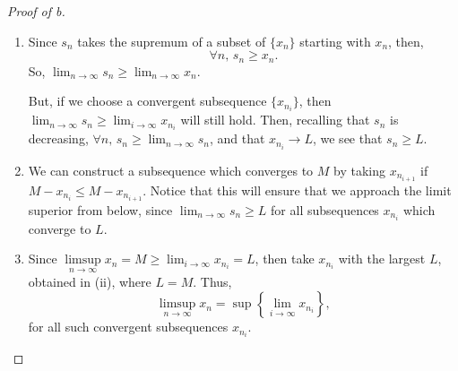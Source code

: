 \documentclass[../quiz3]{subfiles}
\begin{document}
\begin{proof}[Proof of b]
	\begin{enumerate}[label=\textit{(\roman*)}]
		\item Since $s_n$ takes the supremum of a subset of  $\{x_n\} $ starting with $x_n$, then, \[
			      \forall n,\, s_n\ge x_n
			      .\] So, $\lim_{n \to \infty} s_n\ge \lim_{n \to \infty} x_n$.

		      But, if we choose a convergent subsequence $\{x_{n_i}\}$, then $\lim_{n \to \infty} s_n\ge \lim_{i \to \infty} x_{n_i}$ will still hold.
		      Then, recalling that $s_n$ is decreasing, $\forall n,\, s_n\ge \lim_{n \to \infty} s_n$, and that $x_{n_i}\to L$, we see that $s_n\ge L$.
		\item We can construct a subsequence which converges to $M$ by taking  $x_{n_{i+1}}$ if $M-x_{n_i}\le M-x_{n_{i+1}}$. Notice that this will ensure that we approach the limit superior from below, since $\lim_{n \to \infty} s_n \ge L$ for all subsequences $x_{n_i}$ which converge to $L$.
		\item Since $\limsup\limits_{n \to \infty} x_n=M\ge \lim_{i \to \infty} x_{n_i} = L$, then take $x_{n_i}$ with the largest $L$, obtained in (ii), where $L=M$. Thus,  \[
			      \limsup_{n \to \infty} x_n = \sup \left\{\lim_{i \to \infty} x_{n_i}\right\}
			      ,\] for all such convergent subsequences $x_{n_i}$.
	\end{enumerate}
\end{proof}
\end{document}
